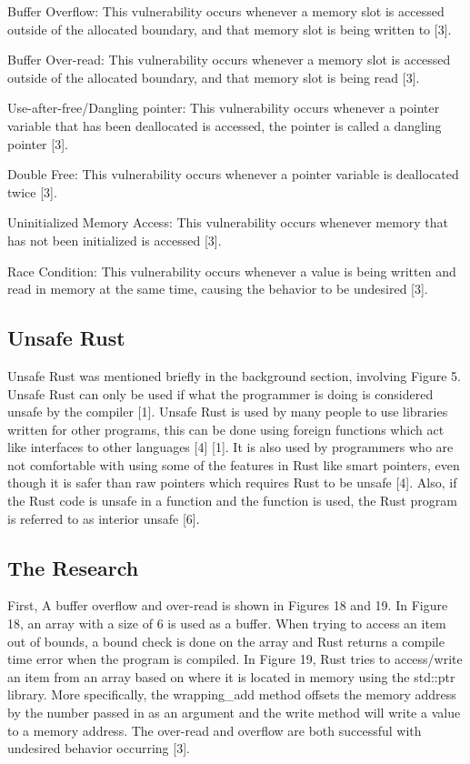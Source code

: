 \documentclass[sigconf,authorversion,nonacm]{acmart}
\begin{document}
Buffer Overflow: This vulnerability occurs whenever a memory slot is accessed outside of the allocated boundary, and that memory slot is being written to [3].

Buffer Over-read: This vulnerability occurs whenever a memory slot is accessed outside of the allocated boundary, and that memory slot is being read [3].

Use-after-free/Dangling pointer: This vulnerability occurs whenever a pointer variable that has been deallocated is accessed, the pointer is called a dangling pointer [3].

Double Free: This vulnerability occurs whenever a pointer variable is deallocated twice [3].

Uninitialized Memory Access: This vulnerability occurs whenever memory that has not been initialized is accessed [3].

Race Condition: This vulnerability occurs whenever a value is being written and read in memory at the same time, causing the behavior to be undesired [3].

\subsection*{Unsafe Rust}
Unsafe Rust was mentioned briefly in the background section, involving Figure 5. Unsafe Rust can only be used if what the programmer is doing is considered unsafe by the compiler [1]. Unsafe Rust is used by many people to use libraries written for other programs, this can be done using foreign functions which act like interfaces to other languages [4] [1]. It is also used by programmers who are not comfortable with using some of the features in Rust like smart pointers, even though it is safer than raw pointers which requires Rust to be unsafe [4]. Also, if the Rust code is unsafe in a function and the function is used, the Rust program is referred to as interior unsafe [6].

\subsection*{The Research}

First, A buffer overflow and over-read is shown in Figures 18 and 19. In Figure 18, an array with a size of 6 is used as a buffer. When trying to access an item out of bounds, a bound check is done on the array and Rust returns a compile time error when the program is compiled. In Figure 19, Rust tries to access/write an item from an array based on where it is located in memory using the std::ptr library. More specifically, the wrapping\_add method offsets the memory address by the number passed in as an argument and the write method will write a value to a memory address. The over-read and overflow are both successful with undesired behavior occurring [3].
\end{document}
